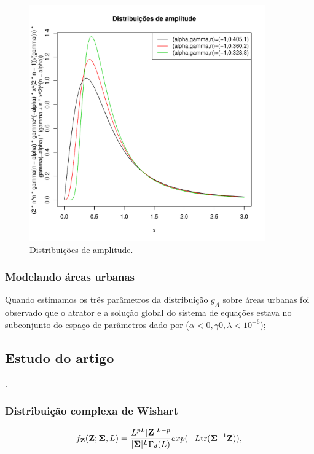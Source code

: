 \documentclass[12pt,a4paper]{article}
\begin{document}
\begin{figure}[!htb]
\centering
\includegraphics[width=4.0in]{fig_eq_ga_fig2_frery_muller_1997.pdf}
	\caption{Distribuições de amplitude.}
\label{fig12}
\end{figure}

\subsubsection{Modelando áreas urbanas}

Quando estimamos os três parâmetros da distribuíção $g_A$ sobre áreas urbanas foi observado que o atrator e a solução global do sistema de equações estava  no subconjunto do espaço de parâmetros dado por ($\alpha<0,\gamma0,\lambda<10^{-6}$); 

\subsection{Estudo do artigo  \cite{frery_nascimento_2014}}.

\subsubsection{Distribuição complexa de Wishart}

\begin{equation}\label{eqn114}
	f_{\mathbf{Z}}(\mathbf{Z};\mathbf{\Sigma},L)=\frac{L^{pL}|\mathbf{Z}|^{L-p}}{|\mathbf{\Sigma}|^{L}\Gamma_d(L)} exp(-L\mathrm{tr}{(\mathbf{\Sigma}^{-1}\mathbf{Z})}), \\
\end{equation}
\end{document}
